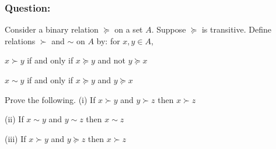 \documentclass[12pt,a4paper]{article}
\begin{document}
  \subsubsection*{Question:} Consider a binary relation \(\succeq \) on a set \(A\). Suppose \(\succeq \) is transitive. Define relations \(\succ \) and \(\sim \) on \(A\) by: for \(x, y \in A\),

  \(x \succ y\) if and only if \(x \succeq y\) and not \(y \succeq x\)

  \(x \sim y\) if and only if \(x \succeq y\) and \(y \succeq x\)

Prove the following.
(i) If \(x \succ y\) and \(y \succ z\) then \(x \succ z\)

(ii) If \(x \sim y\) and \(y \sim z\) then \(x \sim z\)

(iii) If \(x \succ y\) and \(y \succeq z\) then \(x \succ z\)
\end{document}
